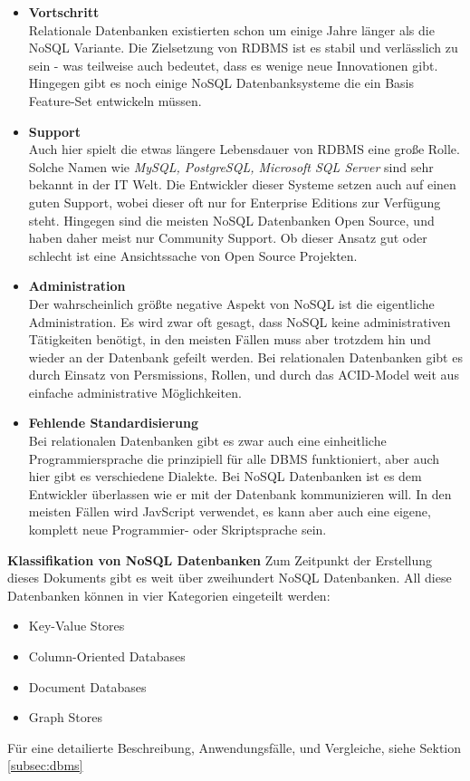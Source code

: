 \begin{itemize}
	\item \textbf{Vortschritt\\}
	Relationale Datenbanken existierten schon um einige Jahre länger als die NoSQL Variante. Die Zielsetzung von RDBMS ist es stabil und verlässlich zu sein - was teilweise auch bedeutet, dass es wenige neue Innovationen gibt. Hingegen gibt es noch einige NoSQL Datenbanksysteme die ein Basis Feature-Set entwickeln müssen.

	\item \textbf{Support\\}
	Auch hier spielt die etwas längere Lebensdauer von RDBMS eine große Rolle. Solche Namen wie \textit{MySQL, PostgreSQL, Microsoft SQL Server} sind sehr bekannt in der IT Welt. Die Entwickler dieser Systeme setzen auch auf einen guten Support, wobei dieser oft nur for Enterprise Editions zur Verfügung steht. Hingegen sind die meisten NoSQL Datenbanken Open Source, und haben daher meist nur Community Support. Ob dieser Ansatz gut oder schlecht ist eine Ansichtssache von Open Source Projekten.

	\item \textbf{Administration\\}
	Der wahrscheinlich größte negative Aspekt von NoSQL ist die eigentliche Administration. Es wird zwar oft gesagt, dass NoSQL keine administrativen Tätigkeiten benötigt, in den meisten Fällen muss aber trotzdem hin und wieder an der Datenbank gefeilt werden. Bei relationalen Datenbanken gibt es durch Einsatz von Persmissions, Rollen, und durch das ACID-Model weit aus einfache administrative Möglichkeiten.

	\item \textbf{Fehlende Standardisierung\\}
	Bei relationalen Datenbanken gibt es zwar auch eine einheitliche Programmiersprache die prinzipiell für alle DBMS funktioniert, aber auch hier gibt es verschiedene Dialekte. Bei NoSQL Datenbanken ist es dem Entwickler überlassen wie er mit der Datenbank kommunizieren will. In den meisten Fällen wird JavScript verwendet, es kann aber auch eine eigene, komplett neue Programmier- oder Skriptsprache sein.
\end{itemize}

\textbf{Klassifikation von NoSQL Datenbanken\newline}
Zum Zeitpunkt der Erstellung dieses Dokuments gibt es weit über zweihundert NoSQL Datenbanken\cite{MELD.CH2-noSQL.listOfNoSQLDB}. All diese Datenbanken können in vier Kategorien eingeteilt werden:

\begin{itemize}
	\item Key-Value Stores
	\item Column-Oriented Databases
	\item Document Databases
	\item Graph Stores
\end{itemize}

Für eine detailierte Beschreibung, Anwendungsfälle, und Vergleiche, siehe Sektion \ref{subsec:dbms}

\clearpage